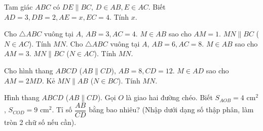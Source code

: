 \begin{bt}%
	Tam giác $ABC$ có $DE \parallel BC$, $D \in AB, E \in AC$. Biết $AD=3, DB=2, AE=x, EC=4$. Tính $x$.
\end{bt}

\begin{bt}%
	Cho $\triangle ABC$ vuông tại $A$, $AB=3, AC=4$. $M \in AB$ sao cho $AM=1$. $MN \parallel BC$ ($N \in AC$). Tính $MN$.
	Cho $\triangle ABC$ vuông tại $A$, $AB=6, AC=8$. $M \in AB$ sao cho $AM=3$. $MN \parallel BC$ ($N \in AC$). Tính $MN$.
\end{bt}

\begin{bt}%
	Cho hình thang $ABCD$ ($AB \parallel CD$), $AB=8, CD=12$. $M \in AD$ sao cho $AM=2MD$. Kẻ $MN \parallel AB$ ($N \in BC$). Tính $MN$.
\end{bt}

\begin{bt}%
	Hình thang $ABCD$ ($AB \parallel CD$). Gọi $O$ là giao hai đường chéo. Biết $S_{AOB} = 4\text{ cm}^2$, $S_{COD} = 9\text{ cm}^2$. Tỉ số $\dfrac{AB}{CD}$ bằng bao nhiêu? (Nhập dưới dạng số thập phân, làm tròn 2 chữ số nếu cần).
\end{bt}

